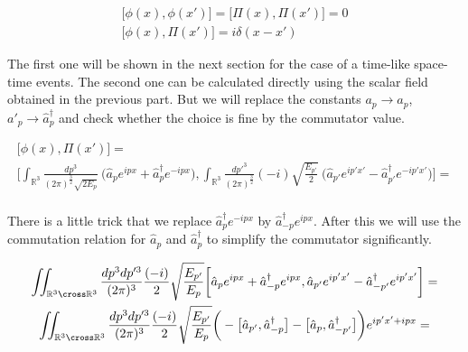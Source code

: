\begin{equation*}
    \begin{gathered}
        \big[\phi(x), \phi(x')] = \big[\Pi(x), \Pi(x')] = 0 \\
        \big[\phi(x), \Pi(x')] = i \delta(x - x')
    \end{gathered}
\end{equation*}

The first one will be shown in the next section for the case of a time-like space-time events. The second one can be calculated
directly using the scalar field obtained in the previous part. But we will replace the constants $a_{p} \to \hat{a}_{p}$, 
$a'_{p} \to \hat{a}^{\dagger}_{p}$ and check whether the choice is fine by the commutator value.

\begin{equation*}
    \begin{gathered}
        \big[\phi(x), \Pi(x')] = \\
        \bigg[
            \int_{\mathbb{R}^{3}} \frac{dp^{3}}{(2 \pi)^{\frac{3}{2}} \sqrt{2 E_{p}}} \ \big(\hat{a}_{p} e^{i p x} + \hat{a}^{\dagger}_{p} e^{- i p x}\big),
            \int_{\mathbb{R}^{3}} \frac{dp'^{3}}{(2 \pi)^{\frac{3}{2}}} (-i) \sqrt{\frac{E_{p'}}{2}} \ \big(\hat{a}_{p'} e^{i p' x'} - \hat{a}^{\dagger}_{p'} e^{- i p' x'}\big)
        \bigg] = \\
    \end{gathered}
\end{equation*}

There is a little trick that we replace $\hat{a}^{\dagger}_{p} e^{- i p x}$ by $\hat{a}^{\dagger}_{-p} e^{i p x}$. After this we will
use the commutation relation for $\hat{a}_{p}$ and $\hat{a}^{\dagger}_{p}$ to simplify the commutator significantly.

\begin{equation*}
    \begin{gathered}
        \iint_{\mathbb{R}^{3} \cross \mathbb{R}^{3}} \frac{dp^{3} dp'^{3}}{(2 \pi)^{3}} \frac{(-i)}{2} \sqrt{\frac{E_{p'}}{E_{p}}}
        \bigg[
            \hat{a}_{p} e^{i p x} + \hat{a}^{\dagger}_{-p} e^{i p x},
            \hat{a}_{p'} e^{i p' x'} - \hat{a}^{\dagger}_{-p'} e^{i p' x'}
        \bigg] = \\
        \iint_{\mathbb{R}^{3} \cross \mathbb{R}^{3}} \frac{dp^{3} dp'^{3}}{(2 \pi)^{3}} \frac{(-i)}{2} \sqrt{\frac{E_{p'}}{E_{p}}}
        \bigg(
           - \big[ \hat{a}_{p'}, \hat{a}^{\dagger}_{-p} \big]
           - \big[ \hat{a}_{p}, \hat{a}^{\dagger}_{-p'} \big] 
        \bigg) e^{i p' x' + i p x}=
    \end{gathered}
\end{equation*}

